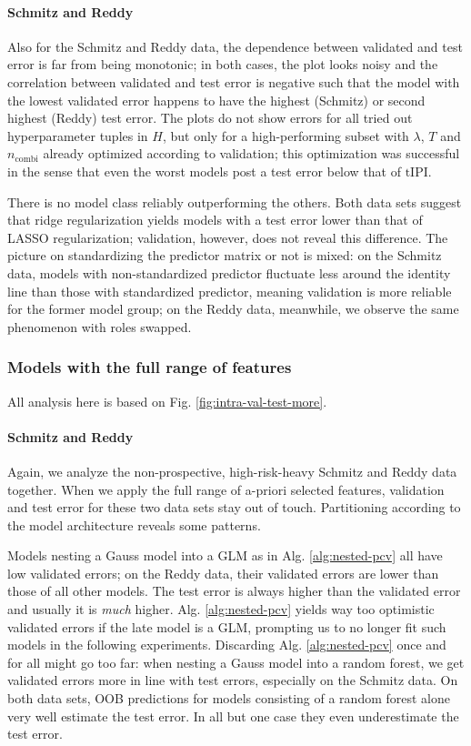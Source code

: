 \paragraph{Schmitz and Reddy}
Also for the Schmitz and Reddy data, the dependence between validated and test error is far from 
being monotonic; in both cases, the plot looks noisy and the correlation between validated and test 
error is negative such that the model with the lowest validated error happens to have the highest 
(Schmitz) or second highest (Reddy) test error. The plots do not show errors for all tried out 
hyperparameter tuples in $H$, but only for a high-performing subset with $\lambda$, $T$ and 
$n_\text{combi}$ already 
optimized according to validation; this optimization was successful in the sense that even the worst models post a test 
error below that of $\text{tIPI}$.

There is no model class reliably outperforming the others. Both data sets suggest that ridge 
regularization yields models with a test error lower than that of LASSO regularization; validation, 
however, does not reveal this difference. The picture on standardizing the predictor matrix or not 
is mixed: on the 
Schmitz data, models with non-standardized predictor fluctuate less around the identity line than 
those with standardized predictor, meaning validation is more reliable for the former model group;
on the Reddy data, meanwhile, we observe the same phenomenon with roles swapped.

\subsubsection{Models with the full range of features}



All analysis here is based on Fig. \ref{fig:intra-val-test-more}.

\paragraph{Schmitz and Reddy}
Again, we analyze the non-prospective, high-risk-heavy Schmitz and Reddy data together. When we apply
the full range of a-priori selected features, validation and test error for these two data sets 
stay out of touch. Partitioning according to the model architecture reveals some patterns. 

Models 
nesting a Gauss model into a GLM as in Alg. \ref{alg:nested-pcv} all have low validated errors; on 
the Reddy data, their validated errors are lower than those of all other models. The test error is 
always higher than the validated error and usually it is \textit{much} higher. Alg. \ref{alg:nested-pcv} 
yields way too optimistic validated errors if the late model is a GLM, prompting us to no longer 
fit such models in the following experiments. Discarding Alg. \ref{alg:nested-pcv} once and for all
might go too far: when nesting a Gauss model into a random forest, we get validated errors more in 
line with test errors, especially on the Schmitz data. On both data sets, OOB predictions for 
models consisting of a random forest alone very well estimate the test error. In all but one case 
they even underestimate the test error. 

